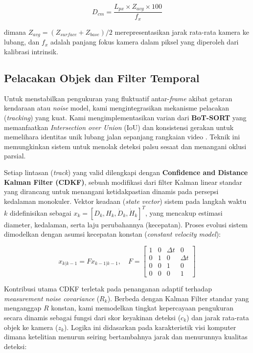 \begin{equation}
D_{cm} = \frac{L_{px} \times Z_{avg} \times 100}{f_x}
\end{equation}

dimana $Z_{avg} = (Z_{surface} + Z_{base}) / 2$ merepresentasikan jarak rata-rata kamera ke lubang, dan $f_x$ adalah panjang fokus kamera dalam piksel yang diperoleh dari kalibrasi intrinsik.


\subsection{Pelacakan Objek dan Filter Temporal}
Untuk menstabilkan pengukuran yang fluktuatif antar-\textit{frame} akibat getaran kendaraan atau \textit{noise} model, kami mengintegrasikan mekanisme pelacakan (\textit{tracking}) yang kuat. Kami mengimplementasikan varian dari \textbf{BoT-SORT} yang memanfaatkan \textit{Intersection over Union} (IoU) dan konsistensi gerakan untuk memelihara identitas unik lubang jalan sepanjang rangkaian video \cite{aharon2022}. Teknik ini memungkinkan sistem untuk menolak deteksi palsu sesaat dan menangani oklusi parsial.

Setiap lintasan (\textit{track}) yang valid dilengkapi dengan \textbf{Confidence and Distance Kalman Filter (CDKF)}, sebuah modifikasi dari filter Kalman linear standar yang dirancang untuk menangani ketidakpastian dinamis pada persepsi kedalaman monokuler. Vektor keadaan (\textit{state vector}) sistem pada langkah waktu $k$ didefinisikan sebagai $x_k = [D_k, H_k, \dot{D}_k, \dot{H}_k]^T$, yang mencakup estimasi diameter, kedalaman, serta laju perubahannya (kecepatan). Proses evolusi sistem dimodelkan dengan asumsi kecepatan konstan (\textit{constant velocity model}):

\begin{equation}
x_{k|k-1} = F x_{k-1|k-1}, \quad F = \begin{bmatrix} 1 & 0 & \Delta t & 0 \\ 0 & 1 & 0 & \Delta t \\ 0 & 0 & 1 & 0 \\ 0 & 0 & 0 & 1 \end{bmatrix}
\end{equation}

Kontribusi utama CDKF terletak pada penanganan adaptif terhadap \textit{measurement noise covariance} ($R_k$). Berbeda dengan Kalman Filter standar yang menganggap $R$ konstan, kami memodelkan tingkat kepercayaan pengukuran secara dinamis sebagai fungsi dari skor keyakinan deteksi ($c_k$) dan jarak rata-rata objek ke kamera ($z_k$). Logika ini didasarkan pada karakteristik visi komputer dimana ketelitian menurun seiring bertambahnya jarak dan menurunnya kualitas deteksi:

